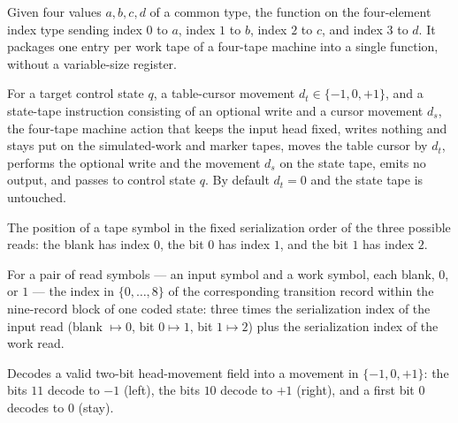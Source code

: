 \begin{definition}
\label{Turing.universalFour}
\leanok
Given four values $a, b, c, d$ of a common type, the function on the
four-element index type sending index $0$ to $a$, index $1$ to $b$, index $2$
to $c$, and index $3$ to $d$.  It packages one entry per work tape of a
four-tape machine into a single function, without a variable-size register.
\end{definition}

\begin{definition}
\label{Turing.universalAdmin}
\leanok
{}
For a target control state $q$, a table-cursor movement
$d_t \in \{-1, 0, +1\}$, and a state-tape instruction consisting of an
optional write and a cursor movement $d_s$, the four-tape machine action that
keeps the input head fixed, writes nothing and stays put on the
simulated-work and marker tapes, moves the table cursor by $d_t$, performs
the optional write and the movement $d_s$ on the state tape, emits no output,
and passes to control state $q$.  By default $d_t = 0$ and the state tape is
untouched.
\end{definition}

\begin{definition}
\label{Turing.universalReadIndex}
\leanok
The position of a tape symbol in the fixed serialization order of the three
possible reads: the blank has index $0$, the bit $0$ has index $1$, and the
bit $1$ has index $2$.
\end{definition}

\begin{definition}
\label{Turing.universalRecordIndex}
\leanok
{}
For a pair of read symbols --- an input symbol and a work symbol, each blank,
$0$, or $1$ --- the index in $\{0, \dots, 8\}$ of the corresponding transition
record within the nine-record block of one coded state: three times the
serialization index of the input read (blank $\mapsto 0$, bit $0 \mapsto 1$,
bit $1 \mapsto 2$) plus the serialization index of the work read.
\end{definition}

\begin{definition}
\label{Turing.universalSign}
\leanok
Decodes a valid two-bit head-movement field into a movement in
$\{-1, 0, +1\}$: the bits $11$ decode to $-1$ (left), the bits $10$ decode to
$+1$ (right), and a first bit $0$ decodes to $0$ (stay).
\end{definition}


